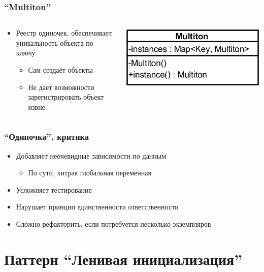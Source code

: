 \documentclass[xetex,mathserif,serif]{beamer}
\begin{document}
	\begin{frame}
		\frametitle{``Multiton''}
		\begin{columns}
			\begin{column}{0.6\textwidth}
				\begin{itemize}
					\item Реестр одиночек, обеспечивает уникальность объекта по ключу
					\begin{itemize}
						\item Сам создаёт объекты
						\item Не даёт возможности зарегистрировать объект извне
					\end{itemize}
				\end{itemize}
			\end{column}
			\begin{column}{0.4\textwidth}
				\includegraphics[width=\textwidth]{multiton.png}
			\end{column}
		\end{columns}
	\end{frame}

	\begin{frame}
		\frametitle{``Одиночка'', критика}
		\begin{itemize}
			\item Добавляет неочевидные зависимости по данным
			\begin{itemize}
				\item По сути, хитрая глобальная переменная
			\end{itemize}
			\item Усложняет тестирование
			\item Нарушает принцип единственности ответственности
			\item Сложно рефакторить, если потребуется несколько экземпляров
		\end{itemize}
	\end{frame}

	\section{Паттерн ``Ленивая инициализация''}
\end{document}
